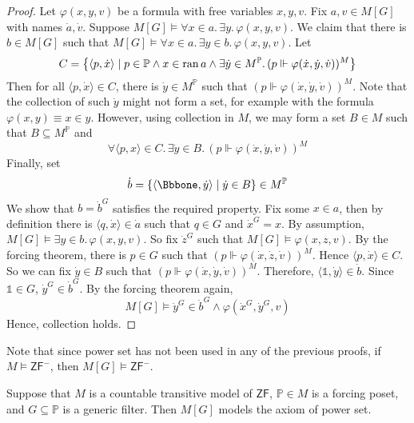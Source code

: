 \begin{proof}
    Let \( \varphi(x, y, v) \) be a formula with free variables \( x, y, v \).
    Fix \( a, v \in M[G] \) with names \( \dot a, \dot v \).
    Suppose \( M[G] \vDash \forall x \in a.\, \exists y.\, \varphi(x, y, v) \).
    We claim that there is \( b \in M[G] \) such that \( M[G] \vDash \forall x \in a.\, \exists y \in b.\, \varphi(x, y, v) \).
    Let
    \[ C = \qty{\langle p, \dot x \rangle \mid p \in \mathbb P \wedge x \in \operatorname{ran}a \wedge \exists \dot y \in M^{\mathbb P}.\, (p \Vdash \varphi(\dot x, \dot y, \dot v))^M} \]
    Then for all \( \langle p, \dot x \rangle \in C \), there is \( \dot y \in M^{\mathbb P} \) such that \( (p \Vdash \varphi(\dot x, \dot y, \dot v))^M \).
    Note that the collection of such \( \dot y \) might not form a set, for example with the formula \( \varphi(x, y) \equiv x \in y \).
    However, using collection in \( M \), we may form a set \( B \in M \) such that \( B \subseteq M^{\mathbb P} \) and
    \[ \forall \langle p, x \rangle \in C.\, \exists \dot y \in B.\, (p \Vdash \varphi(\dot x, \dot y, \dot v))^M \]
    Finally, set
    \[ \dot b = \qty{\langle \Bbbone, \dot y \rangle \mid \dot y \in B} \in M^{\mathbb P} \]
    We show that \( b = \dot b^G \) satisfies the required property.
    Fix some \( x \in a \), then by definition there is \( \langle q, \dot x \rangle \in \dot a \) such that \( q \in G \) and \( \dot x^G = x \).
    By assumption, \( M[G] \vDash \exists y \in b.\, \varphi(x, y, v) \).
    So fix \( \dot z^G \) such that \( M[G] \vDash \varphi(x, z, v) \).
    By the forcing theorem, there is \( p \in G \) such that \( (p \Vdash \varphi(\dot x, \dot z, \dot v))^M \).
    Hence \( \langle p, \dot x \rangle \in C \).
    So we can fix \( \dot y \in B \) such that \( (p \Vdash \varphi(\dot x, \dot y, \dot v))^M \).
    Therefore, \( \langle \Bbbone, \dot y \rangle \in \dot b \).
    Since \( \Bbbone \in G \), \( \dot y^G \in \dot b^G \).
    By the forcing theorem again,
    \[ M[G] \vDash \dot y^G \in \dot b^G \wedge \varphi(\dot x^G, \dot y^G, v) \]
    Hence, collection holds.
\end{proof}
Note that since power set has not been used in any of the previous proofs, if \( M \vDash \mathsf{ZF}^- \), then \( M[G] \vDash \mathsf{ZF}^- \).
\begin{lemma}
    Suppose that \( M \) is a countable transitive model of \( \mathsf{ZF} \), \( \mathbb P \in M \) is a forcing poset, and \( G \subseteq \mathbb P \) is a generic filter.
    Then \( M[G] \) models the axiom of power set.
\end{lemma}
